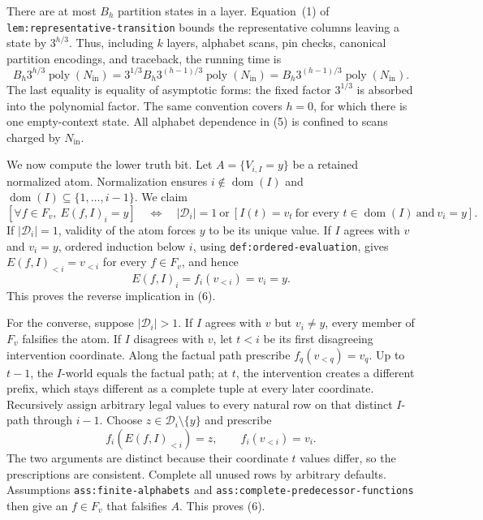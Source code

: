 There are at most \(B_h\) partition states in a layer.  Equation~(1) of \texttt{lem:representative-transition} bounds the representative columns leaving a state by \(3^{h/3}\).  Thus, including \(k\) layers, alphabet scans, pin checks, canonical partition encodings, and traceback, the running time is
\[
 B_h3^{h/3}\operatorname{poly}(N_{\mathrm{in}})
 =3^{1/3}B_h3^{(h-1)/3}\operatorname{poly}(N_{\mathrm{in}})
 =B_h3^{(h-1)/3}\operatorname{poly}(N_{\mathrm{in}}).
\tag{5}
\]
The last equality is equality of asymptotic forms: the fixed factor \(3^{1/3}\) is absorbed into the polynomial factor.  The same convention covers \(h=0\), for which there is one empty-context state.  All alphabet dependence in (5) is confined to scans charged by \(N_{\mathrm{in}}\).

We now compute the lower truth bit.  Let \(A=\{V_{i,I}=y\}\) be a retained normalized atom.  Normalization ensures \(i\notin\operatorname{dom}(I)\) and \(\operatorname{dom}(I)\subseteq\{1,\ldots,i-1\}\).  We claim
\[
 \left[\forall f\in F_v,\ E(f,I)_i=y\right]
 \quad\Longleftrightarrow\quad
 |\mathcal D_i|=1
 \ \text{or}\ 
 \left[I(t)=v_t\ \text{for every }t\in\operatorname{dom}(I)\ \text{and}\ v_i=y\right].
\tag{6}
\]
If \(|\mathcal D_i|=1\), validity of the atom forces \(y\) to be its unique value.  If \(I\) agrees with \(v\) and \(v_i=y\), ordered induction below \(i\), using \texttt{def:ordered-evaluation}, gives \(E(f,I)_{<i}=v_{<i}\) for every \(f\in F_v\), and hence
\[
 E(f,I)_i=f_i(v_{<i})=v_i=y.
\]
This proves the reverse implication in (6).

For the converse, suppose \(|\mathcal D_i|>1\).  If \(I\) agrees with \(v\) but \(v_i\neq y\), every member of \(F_v\) falsifies the atom.  If \(I\) disagrees with \(v\), let \(t<i\) be its first disagreeing intervention coordinate.  Along the factual path prescribe \(f_q(v_{<q})=v_q\).  Up to \(t-1\), the \(I\)-world equals the factual path; at \(t\), the intervention creates a different prefix, which stays different as a complete tuple at every later coordinate.  Recursively assign arbitrary legal values to every natural row on that distinct \(I\)-path through \(i-1\).  Choose \(z\in\mathcal D_i\setminus\{y\}\) and prescribe
\[
 f_i(E(f,I)_{<i})=z,
 \qquad f_i(v_{<i})=v_i.
\]
The two arguments are distinct because their coordinate \(t\) values differ, so the prescriptions are consistent.  Complete all unused rows by arbitrary defaults.  Assumptions \texttt{ass:finite-alphabets} and \texttt{ass:complete-predecessor-functions} then give an \(f\in F_v\) that falsifies \(A\).  This proves (6).

